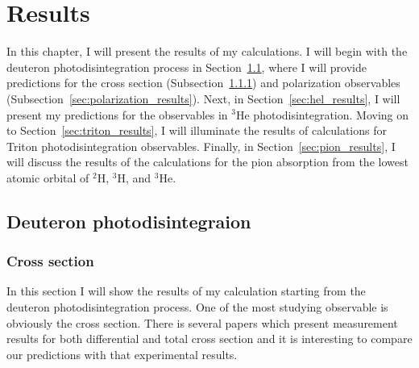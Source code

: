 \chapter{Results}\label{chap:results}

    In this chapter, I will present the results of my calculations. I will begin with the deuteron photodisintegration process in Section~\ref{sec:de_results}, where I will provide predictions for the cross section (Subsection~\ref{sec:cross_results}) and polarization observables (Subsection~\ref{sec:polarization_results}).
    Next, in Section~\ref{sec:hel_results}, I will present my predictions for 
    the observables in $^3$He photodisintegration.
    Moving on to Section~\ref{sec:triton_results}, I will illuminate the results of calculations for
    Triton photodisintegration observables.
    Finally, in Section~\ref{sec:pion_results}, I will discuss the results of the calculations for
    the pion absorption from the lowest atomic orbital of $^2$H, $^3$H, and $^3$He.

\section{Deuteron photodisintegraion}
\label{sec:de_results}
    \subsection{Cross section}
    \label{sec:cross_results}

    In this section I will show the results of my calculation starting from the
    deuteron photodisintegration process. One of the most
    studying observable is obviously the cross section. There is
    several papers which present 
    measurement results for both differential and total cross section
    \cite{BOSMAN1979,ARENDS1984,Skopik1974, Moreh1989, Birenbaum1985, Bernabei1986, rachek2007,Ying_Experiment_Deut, DeSanctis_Experiment_Deut} 
    and it is interesting to compare 
    our predictions with that experimental results.

